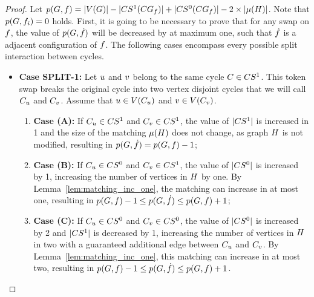 \documentclass[msc,english,table,xcdraw]{ppgccufmg}
\begin{document}
\begin{proof}
Let $p(G, f) = |V(G)| - 
|CS^{1}(CG_{f})| +
|CS^{0}(CG_{f})| - 2\times|\mu(H)|$.
Note that $p(G, f_{i}) = 0$ holds.
First, it is going to be necessary to prove that for any swap on $f$,
the value of $p(G, \dot{f})$ will be decreased
by at maximum one, such that $\dot{f}$ is a adjacent configuration
of $f$.
The following cases encompass every possible split interaction between 
cycles.

\begin{itemize}
    \item \textbf{Case SPLIT-1:} Let $u$ and $v$ belong to 
    the same cycle $C \in CS^{1}$. 
    This token swap breaks the original cycle into two vertex disjoint cycles that
    we will call $C_{u}$ and $C_{v}$.
    Assume that $u \in V(C_{u})$ and 
    $v \in V(C_{v})$.
    
    \begin{enumerate}
        \item[] \textbf{Case (A):} If $C_{u} \in CS^{1}$ and 
        $C_{v} \in CS^{1}$, the value of $|CS^{1}|$ is
        increased in 1 and the size of the matching $\mu(H)$
        does not change, as graph $H$ is not modified, resulting in
        $p(G, \dot{f}) = p(G, f) - 1$;
        \item[] \textbf{Case (B):} If  $C_{u} \in CS^{0}$ and 
        $C_{v} \in CS^{1}$, the value of $|CS^{0}|$ is
        increased by 1, increasing the number of vertices in $H$ by
        one.
        By Lemma~\ref{lem:matching_inc_one}, the matching can increase in at most
        one, resulting in $p(G, f) - 1 \leq p(G, \dot{f}) \leq p(G, f) + 1$;
        \item[] \textbf{Case (C):} If $C_{u} \in CS^{0}$ and 
        $C_{v} \in CS^{0}$, the value of $|CS^{0}|$
        is increased by 2 and $|CS^{1}|$ is decreased by 1, increasing
        the number of vertices in $H$ in two with a guaranteed additional
        edge between $C_{u}$ and $C_{v}$.
        By Lemma~\ref{lem:matching_inc_one}, this matching can increase in at most
        two, resulting in $p(G, f) - 1 \leq p(G, \dot{f}) \leq p(G, f) + 1$.
    \end{enumerate}
    

\end{itemize}
\end{proof}
\end{document}
